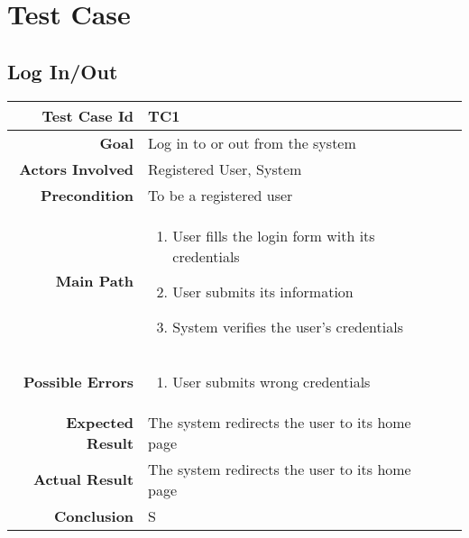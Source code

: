 \chapter{Test Case} \label{cap:cap3}
\section{Log In/Out}
\begin{tabularx}{\linewidth}{|r|X|X|}

  \hline   {\bf Test Case Id} &  TC1\\
  \hline  {\bf Goal} & Log in to or out from the system\\
  \hline  {\bf Actors Involved} & Registered User, System\\
  \hline  {\bf Precondition} & To be a registered user\\ 
   \hline  {\bf Main Path} & \begin{enumerate} 
   \item User fills the login form with its credentials
   \item User submits its information
   \item System verifies the user's credentials
   \end{enumerate}\\
   \hline  {\bf Possible Errors} & \begin{enumerate} 
   \item User submits wrong credentials
   \end{enumerate}\\
  \hline  {\bf Expected Result} & The system redirects the user to its home page\\
  \hline  {\bf Actual Result} & The system redirects the user to its home page\\
  \hline  {\bf Conclusion} & S\\
  \hline
  
\end{tabularx}

